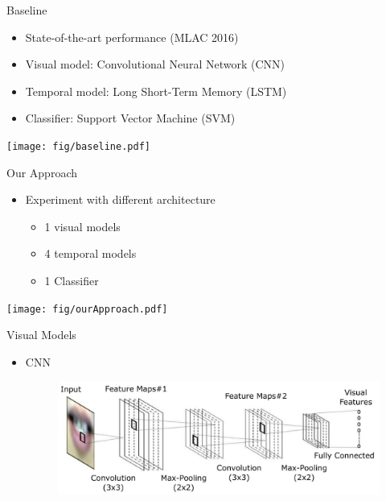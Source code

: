 \documentclass[xcolor=table]{beamer}
\begin{document}
\begin{frame}{Baseline}
    \begin{itemize}
        \item State-of-the-art performance (MLAC 2016)
        \item Visual model: Convolutional Neural Network (CNN)
        \item Temporal model: Long Short-Term Memory (LSTM)
        \item Classifier: Support Vector Machine (SVM)
    \end{itemize}
    \begin{center}
    \texttt{[image: fig/baseline.pdf]}   
    \end{center}
\end{frame}

\begin{frame}{Our Approach}
    \begin{itemize}
        \item Experiment with different architecture
        \begin{itemize}
            \item 1 visual models 
            \item 4 temporal models
            \item 1 Classifier
        \end{itemize}
    \end{itemize}
    \begin{center}
    \texttt{[image: fig/ourApproach.pdf]}   
    \end{center}
\end{frame}

\begin{frame}{Visual Models}
    \begin{itemize}
        \item CNN
        \begin{figure}
        \includegraphics[width=.6\textwidth]{fig/cnnOriginal.jpg}   
        \end{figure}
    \end{itemize}
\end{frame}
\end{document}

